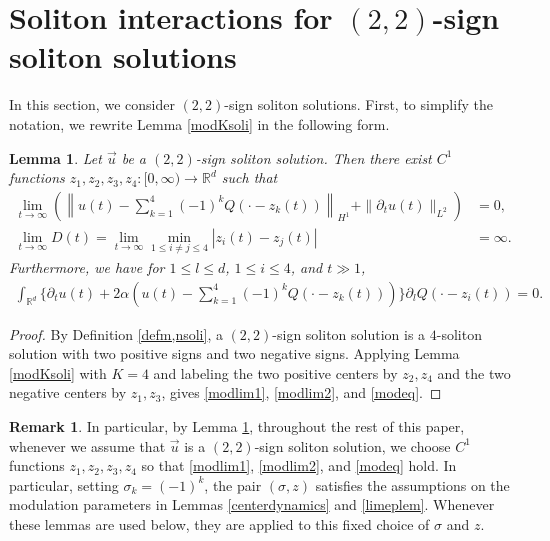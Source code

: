 \documentclass[reqno]{amsart}
\theoremstyle{plain}
\newtheorem{lemma}[theorem]{Lemma}
\theoremstyle{definition}
\newtheorem{remark}{Remark}[section]
\numberwithin{equation}{section}
\begin{document}
\section{Soliton interactions for $(2,2)$-sign soliton solutions}
In this section, we consider $(2,2)$-sign soliton solutions. First, to simplify the notation, we rewrite Lemma \ref{modKsoli} in the following form.
\begin{lemma}\label{Ksolikakikae}
Let $\vec{u}$ be a $(2,2)$-sign soliton solution. Then there exist $C^1$ functions $z_1,z_2,z_3,z_4:[0,\infty)\to \mathbb{R}^d$ such that 
\begin{align}
\lim_{t\to\infty}(\left\| u(t)-\sum_{k=1}^4 (-1)^kQ(\cdot-z_k(t))\right\|_{H^1}+\|{\partial}_tu(t)\|_{L^2})&=0,\label{modlim1}
\\
\lim_{t\to\infty}D(t)=\lim_{t\to\infty} \min_{1\leq i\neq j\leq 4}|z_i(t)-z_j(t)|&=\infty. \label{modlim2}
\end{align}
Furthermore, we have for $1\leq l\leq d$, $1\leq i\leq 4$, and $t\gg 1$,
\begin{align}\label{modeq}
\int_{\mathbb{R}^d} \{ {\partial}_tu(t)+2\alpha(u(t)-\sum_{k=1}^4 (-1)^kQ(\cdot-z_k(t)))\} {\partial}_lQ(\cdot-z_i(t))=0.
\end{align}
\end{lemma}
\begin{proof}
By Definition \ref{defm,nsoli}, a $(2,2)$-sign soliton solution is a
$4$-soliton solution with two positive signs and two negative signs.
Applying Lemma \ref{modKsoli} with $K=4$ and labeling the two positive
centers by $z_2, z_4$ and the two negative centers by $z_1, z_3$, gives
\eqref{modlim1}, \eqref{modlim2}, and \eqref{modeq}.
\end{proof}


\begin{remark}
In particular, by Lemma \ref{Ksolikakikae}, throughout the rest of this paper, whenever we assume that $\vec{u}$ is a
$(2,2)$-sign soliton solution, we choose $C^1$ functions $z_1,z_2,z_3,z_4$ so that \eqref{modlim1}, \eqref{modlim2},
and \eqref{modeq} hold. In particular, setting $\sigma_k=(-1)^k$, the pair $(\sigma,z)$ satisfies the
assumptions on the modulation parameters in Lemmas \ref{centerdynamics} and \ref{limeplem}. Whenever these lemmas
are used below, they are applied to this fixed choice of $\sigma$ and $z$.
\end{remark}
\end{document}
